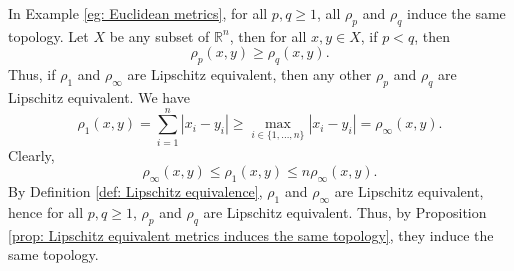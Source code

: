\begin{example}
	In Example \ref{eg: Euclidean metrics}, for all $p,q \ge 1$, all $\rho_p$ and $\rho_q$ induce the same topology. Let $X$ be any subset of $\mathbb R^n$, then for all $x,y \in X$, if $p < q$, then
	$$
	\rho_p (x,y) \ge \rho_q (x,y).
	$$
	Thus, if $\rho_1$ and $\rho_\infty$ are Lipschitz equivalent, then any other $\rho_p$ and $\rho_q$ are Lipschitz equivalent. We have
	$$
	\rho_1 (x,y) = \sum_{i = 1}^n |x_i - y_i| \ge \max_{i \in \{1, \ldots, n\}} |x_i - y_i| = \rho_\infty (x,y).
 	$$
 	Clearly,
 	$$
 	\rho_\infty (x,y) \le \rho_1 (x,y) \le n \rho_\infty (x,y).
 	$$
 	By Definition \ref{def: Lipschitz equivalence}, $\rho_1$ and $\rho_\infty$ are Lipschitz equivalent, hence for all $p, q \ge 1$, $\rho_p$ and $\rho_q$ are Lipschitz equivalent. Thus, by Proposition \ref{prop: Lipschitz equivalent metrics induces the same topology}, they induce the same topology.
\end{example}






























